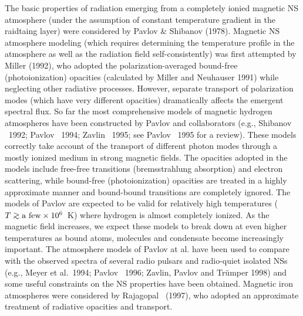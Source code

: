 The basic properties of radiation emerging from a completely ionied
magnetic NS atmosphere (under the assumption of constant temperature gradient
in the raidtaing layer) were considered by Pavlov \& Shibanov (1978).
Magnetic NS atmosphere modeling (which requires determining
the temperature profile in the atmosphere as well as the radiation field 
self-consistently) was first attempted by Miller (1992),
who adopted the polarization-averaged bound-free (photoionization)
opacities (calculated by Miller and Neuhauser 1991) while neglecting other
radiative processes. However, separate transport of polarization modes (which
have very different opacities) dramatically affects the emergent spectral
flux. So far the most comprehensive models of magnetic hydrogen atmospheres
have been constructed by Pavlov and collaborators (e.g., Shibanov \etal~1992;
Pavlov \etal~1994; Zavlin \etal~1995; see Pavlov \etal~1995 for a review). 
These models correctly take account of the transport of different photon modes
through a mostly ionized medium in strong magnetic fields. 
The opacities adopted in the models include free-free
transitions (bremsstrahlung absorption) and electron scattering, while
bound-free (photoionization) opacities are treated in a highly approximate
manner and bound-bound transitions are completely ignored. The models of 
Pavlov \etal are expected to be valid for relatively high temperatures ($T\go
{\rm a~few}\times 10^6$~K) where hydrogen is almost completely ionized. 
As the magnetic field
increases, we expect these models to break down at even higher temperatures as
bound atoms, molecules and condensate become increasingly important. 
The atmosphere models of Pavlov at al. 
have been used to compare with the observed spectra
of several radio pulsars and radio-quiet isolated NSs (e.g., Meyer et
al.~1994; Pavlov \etal~1996; Zavlin, Pavlov and Tr\"umper 1998)
and some useful constraints on the NS properties have been obtained. 
Magnetic iron atmospheres were considered by Rajagopal \etal~(1997),
who adopted an approximate treatment of radiative opacities and transport. 

